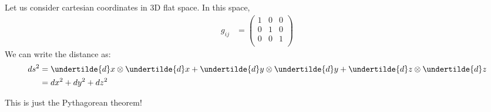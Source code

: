 \documentclass[11pt]{article}
\begin{document}
    \begin{example}
	Let us consider cartesian coordinates in 3D flat space. In this space, 
	    \begin{equation}
            \begin{aligned}
            g_{ij} &= \begin{pmatrix}
                        1  &  0  &  0\\
                        0  &  1  &  0\\
                        0  &  0  &  1\\
                        \end{pmatrix}
            \end{aligned}
        \end{equation}
    We can write the distance as:
        \begin{equation}
            \begin{aligned}
            ds^2 &= \undertilde{d}x \otimes \undertilde{d}x + \undertilde{d}y \otimes \undertilde{d}y + \undertilde{d}z \otimes \undertilde{d}z \\
            &= dx^2 + dy^2 + dz^2
            \end{aligned}
        \end{equation}

    This is just the Pythagorean theorem! 
    
   \begin{figure} [H]
        \begin{centering}
        


\begin{tikzpicture}[x=0.75pt,y=0.75pt,yscale=-1,xscale=1]


\end{tikzpicture}
\end{centering}
\end{figure}
\end{example}
\end{document}
